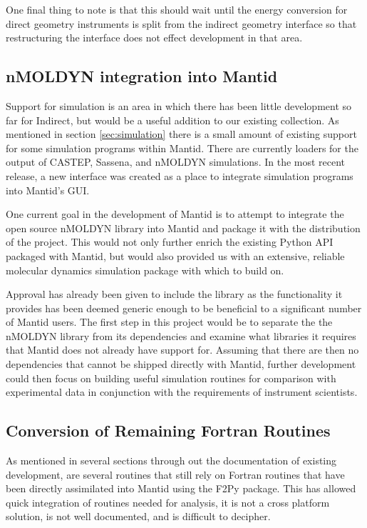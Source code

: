 \documentclass[paper=a4, fontsize=11pt]{scrartcl}	%
\numberwithin{equation}{section}															%
\numberwithin{figure}{section}																%
\numberwithin{table}{section}																%
\begin{document}
One final thing to note is that this should wait until the energy conversion for direct geometry instruments is split from the indirect geometry interface so that restructuring the interface does not effect development in that area.

\subsection{nMOLDYN integration into Mantid}
Support for simulation is an area in which there has been little development so far for Indirect, but would be a useful addition to our existing collection. As mentioned in section \ref{sec:simulation} there is a small amount of existing support for some simulation programs within Mantid. There are currently loaders for the output of CASTEP, Sassena, and nMOLDYN simulations. In the most recent release, a new interface was created as a place to integrate simulation programs into Mantid's GUI.

One current goal in the development of Mantid is to attempt to integrate the open source nMOLDYN library into Mantid and package it with the distribution of the project. This would not only further enrich the existing Python API packaged with Mantid, but would also provided us with an extensive, reliable molecular dynamics simulation package with which to build on.

Approval has already been given to include the library as the functionality it provides has been deemed generic enough to be beneficial to a significant number of Mantid users. The first step in this project would be to separate the the nMOLDYN library from its dependencies and examine what libraries it requires that Mantid does not already have support for. Assuming that there are then no dependencies that cannot be shipped directly with Mantid, further development could then focus on building useful simulation routines for comparison with experimental data in conjunction with the requirements of instrument scientists.

\subsection{Conversion of Remaining Fortran Routines}
\label{subsec:convert-fortran}
As mentioned in several sections through out the documentation of existing development, are several routines that still rely on Fortran routines that have been directly assimilated into Mantid using the F2Py package. This has allowed quick integration of routines needed for analysis, it is not a cross platform solution, is not well documented, and is difficult to decipher.
\end{document}
